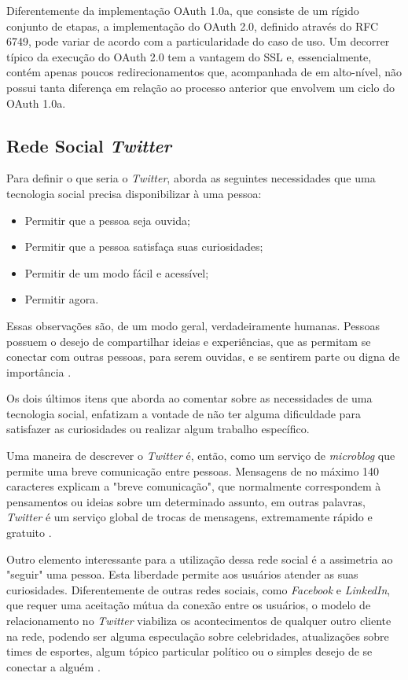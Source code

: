 Diferentemente da implementação OAuth 1.0a, que consiste de um rígido conjunto de etapas, a implementação do OAuth 2.0, definido através do RFC 6749, pode variar de acordo com a particularidade do caso de uso. Um decorrer típico da execução do OAuth 2.0 tem a vantagem do SSL e, essencialmente, contém apenas poucos redirecionamentos que, acompanhada de em alto-nível, não possui tanta diferença em relação ao processo anterior que envolvem um ciclo do OAuth 1.0a.

\subsection{Rede Social \textit{Twitter}}
Para definir o que seria o \textit{Twitter},  aborda as seguintes necessidades que uma tecnologia social precisa disponibilizar à uma pessoa:

\begin{itemize}
	\item Permitir que a pessoa seja ouvida;
	\item Permitir que a pessoa satisfaça suas curiosidades;
	\item Permitir de um modo fácil e acessível;
	\item Permitir agora.
\end{itemize}

Essas observações são, de um modo geral, verdadeiramente humanas. Pessoas possuem o desejo de compartilhar ideias e experiências, que as permitam se conectar com outras pessoas, para serem ouvidas, e se sentirem parte ou digna de importância \cite{twitter2}.

Os dois últimos itens que  aborda ao comentar sobre as necessidades de uma tecnologia social, enfatizam a vontade de não ter alguma dificuldade para satisfazer as curiosidades ou realizar algum trabalho específico.

Uma maneira de descrever o \textit{Twitter} é, então, como um serviço de \textit{microblog} que permite uma breve comunicação entre pessoas. Mensagens de no máximo 140 caracteres explicam a "breve comunicação", que normalmente correspondem à pensamentos ou ideias sobre um determinado assunto, em outras palavras, \textit{Twitter} é um serviço global de trocas de mensagens, extremamente rápido e gratuito \cite{twitter1}.

Outro elemento interessante para a utilização dessa rede social é a assimetria ao "seguir" \space uma pessoa. Esta liberdade permite aos usuários atender as suas curiosidades. Diferentemente de outras redes sociais, como \textit{Facebook} e \textit{LinkedIn}, que requer uma aceitação mútua da conexão entre os usuários, o modelo de relacionamento no \textit{Twitter} viabiliza os acontecimentos de qualquer outro cliente na rede, podendo ser alguma especulação sobre celebridades, atualizações sobre times de esportes, algum tópico particular político ou o simples desejo de se conectar a alguém \cite{twitter2}.


